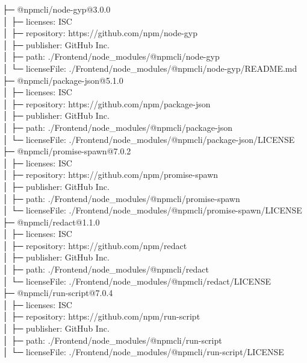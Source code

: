 \documentclass[
    paper=a4,
    twoside=false,
    parskip=half,
    listof=entryprefix,
    listof=totoc,
    index=totoc,
    bibliography=totoc,
    headsepline,
]{scrbook}
\begin{document}
    ├─ @npmcli/node-gyp@3.0.0\\
    │  ├─ licenses: ISC\\
    │  ├─ repository: https://github.com/npm/node-gyp\\
    │  ├─ publisher: GitHub Inc.\\
    │  ├─ path: ./Frontend/node\_modules/@npmcli/node-gyp\\
    │  └─ licenseFile: ./Frontend/node\_modules/@npmcli/node-gyp/README.md\\
    ├─ @npmcli/package-json@5.1.0\\
    │  ├─ licenses: ISC\\
    │  ├─ repository: https://github.com/npm/package-json\\
    │  ├─ publisher: GitHub Inc.\\
    │  ├─ path: ./Frontend/node\_modules/@npmcli/package-json\\
    │  └─ licenseFile: ./Frontend/node\_modules/@npmcli/package-json/LICENSE\\
    ├─ @npmcli/promise-spawn@7.0.2\\
    │  ├─ licenses: ISC\\
    │  ├─ repository: https://github.com/npm/promise-spawn\\
    │  ├─ publisher: GitHub Inc.\\
    │  ├─ path: ./Frontend/node\_modules/@npmcli/promise-spawn\\
    │  └─ licenseFile: ./Frontend/node\_modules/@npmcli/promise-spawn/LICENSE\\
    ├─ @npmcli/redact@1.1.0\\
    │  ├─ licenses: ISC\\
    │  ├─ repository: https://github.com/npm/redact\\
    │  ├─ publisher: GitHub Inc.\\
    │  ├─ path: ./Frontend/node\_modules/@npmcli/redact\\
    │  └─ licenseFile: ./Frontend/node\_modules/@npmcli/redact/LICENSE\\
    ├─ @npmcli/run-script@7.0.4\\
    │  ├─ licenses: ISC\\
    │  ├─ repository: https://github.com/npm/run-script\\
    │  ├─ publisher: GitHub Inc.\\
    │  ├─ path: ./Frontend/node\_modules/@npmcli/run-script\\
    │  └─ licenseFile: ./Frontend/node\_modules/@npmcli/run-script/LICENSE\\
\end{document}
